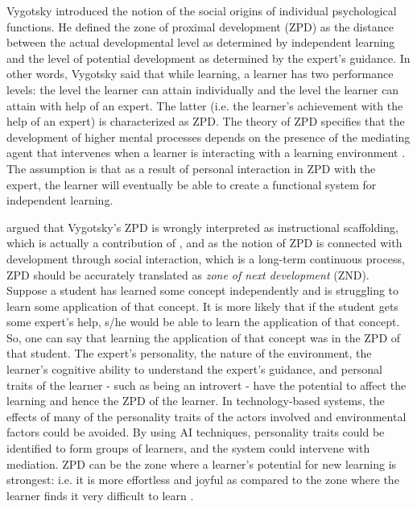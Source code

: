 \begin{multicols}{2}
Vygotsky \cite{art2-key51} introduced the notion of the social origins of individual psychological functions. He defined the zone of proximal development (ZPD) as the distance between the actual developmental level as determined by independent learning and the level of potential development as determined by the expert’s guidance. In other words, Vygotsky said that while learning, a learner has two performance levels: the level the learner can attain individually and the level the learner can attain with help of an expert. The latter (i.e. the learner’s achievement with the help of an expert) is characterized as ZPD. The theory of ZPD specifies that the development of higher mental processes depends on the presence of the mediating agent that intervenes when a learner is interacting with a learning environment \cite{art2-key26}. The assumption is that as a result of personal interaction in ZPD with the expert, the learner will eventually be able to create a functional system for independent learning.

\cite{art2-key46} argued that Vygotsky’s ZPD is wrongly interpreted as instructional scaffolding, which is actually a contribution of \cite{art2-key55}, and as the notion of ZPD is connected with development through social interaction, which is a long-term continuous process, ZPD should be accurately translated as \textit{zone of next development} (ZND). Suppose a student has learned some concept independently and is struggling to learn some application of that concept. It is more likely that if the student gets some expert’s help, s/he would be able to learn the application of that concept. So, one can say that learning the application of that concept was in the ZPD of that student. The expert’s personality, the nature of the environment, the learner’s cognitive ability to understand the expert’s guidance, and personal traits of the learner - such as being an introvert - have the potential to affect the learning and hence the ZPD of the learner. In technology-based systems, the effects of many of the personality traits of the actors involved and environmental factors could be avoided. By using AI techniques, personality traits could be identified to form groups of learners, and the system could intervene with mediation. ZPD can be the zone where a learner’s potential for new learning is strongest: i.e. it is more effortless and joyful as compared to the zone where the learner finds it very difficult to learn \cite{art2-key14}.


\end{multicols}
